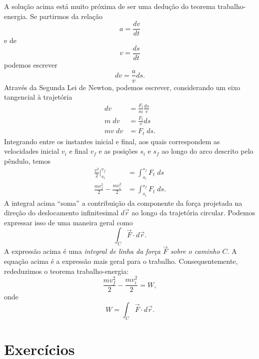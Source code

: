A solução acima está muito próxima de ser uma dedução do teorema trabalho-energia. Se partirmos da relação
\begin{equation}
    a = \frac{dv}{dt}
\end{equation}
%
e de
\begin{equation}
    v = \frac{ds}{dt}
\end{equation}
%
podemos escrever
\begin{equation}
    dv = \frac{a}{v} ds.
\end{equation}
%
Através da Segunda Lei de Newton, podemos escrever, considerando um eixo tangencial à trajetória
\begin{align}
    dv &= \frac{F_t}{m} \frac{ds}{v} \\
    m \; dv &= \frac{F_t}{v} ds \\
    mv \; dv &= F_t \; ds.
\end{align}
%
Integrando entre os instantes inicial e final, aos quais correspondem as velocidades inicial $v_i$ e final $v_f$ e as posições $s_i$ e $s_f$ ao longo do arco descrito pelo pêndulo, temos
\begin{align}
    \frac{v^2}{2}\Big|_{v_i}^{v_f} &= \int_{s_i}^{s_f} F_t \; ds \\
    \frac{mv_f^2}{2} - \frac{mv_i^2}{2} &= \int_{s_i}^{s_f} F_t \; ds.
\end{align}
%
A integral acima ``soma'' a contribuição da componente da força projetada na direção do deslocamento infinitesimal $d\vec{r}$ ao longo da trajetória circular. Podemos expressar isso de uma maneira geral como
\begin{equation}
    \int_C \vec{F} \cdot d\vec{r}.
\end{equation}
%
A expressão acima é uma \emph{integral de linha da força $\vec{F}$ sobre o caminho $C$}. A equação acima é a expressão mais geral para o trabalho. Consequentemente, rededuzimos o teorema trabalho-energia:
\begin{equation}
    \frac{mv_f^2}{2} - \frac{mv_i^2}{2} = W,
\end{equation}
%
onde
\begin{equation}
    W = \int_C \vec{F} \cdot d\vec{r}.
\end{equation}

\section{Exercícios}


